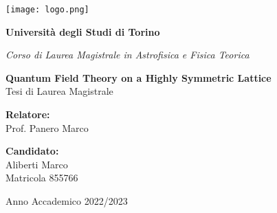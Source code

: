 \pagestyle{empty}
\begin{center}
    \texttt{[image: logo.png]}
    \vspace{0.5cm}\\
    {\LARGE\bfseries Università degli Studi di Torino \par}
	\vspace{0,3cm}
	{\Large\it Corso di Laurea Magistrale in Astrofisica e Fisica Teorica\par}
    \vspace{2cm}
	{\LARGE\bfseries Quantum Field Theory on a Highly Symmetric Lattice}
	\vspace{0.3cm}\\
    {\Large Tesi di Laurea Magistrale}
	\vspace{0,5cm}
\end{center}
\vspace{2cm}
\begin{minipage}[t]{0.4\textwidth} %
    {\large{{\bf Relatore:}\\
        Prof. Panero Marco}}
\end{minipage}
\hfill
\begin{minipage}[t]{0.47\textwidth}\raggedleft %
    {\large{{\bf Candidato:}\\
        Aliberti Marco\\
        Matricola 855766}}
    \vspace{12mm}
\end{minipage}
\hfill
\vspace{18mm}
\begin{center} %
    \large{Anno Accademico 2022/2023}
\end{center} 
